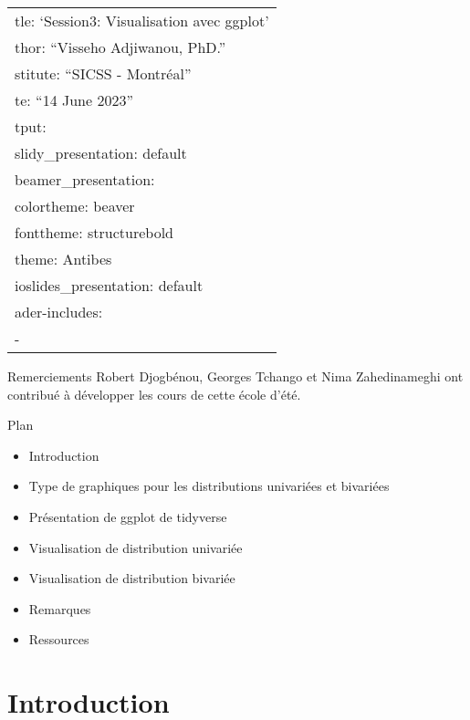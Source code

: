\documentclass[
  ignorenonframetext,
]{beamer}
\author{}
\date{\vspace{-2.5em}}
\providecommand{\tightlist}{%
  \setlength{\itemsep}{0pt}\setlength{\parskip}{0pt}}
\begin{document}
\begin{frame}
\begin{longtable}[]{@{}l@{}}
\toprule()
\endhead
tle: `Session3: Visualisation avec ggplot' \\
thor: ``Visseho Adjiwanou, PhD.'' \\
stitute: ``SICSS - Montréal'' \\
te: ``14 June 2023'' \\
tput: \\
slidy\_presentation: default \\
beamer\_presentation: \\
colortheme: beaver \\
fonttheme: structurebold \\
theme: Antibes \\
ioslides\_presentation: default \\
ader-includes: \\
- \\
\bottomrule()
\end{longtable}
\end{frame}

\begin{frame}{Remerciements}
\protect\hypertarget{remerciements}{}
Robert Djogbénou, Georges Tchango et Nima Zahedinameghi ont contribué à
développer les cours de cette école d'été.
\end{frame}

\begin{frame}{Plan}
\protect\hypertarget{plan}{}
\begin{itemize}
\tightlist
\item
  Introduction
\item
  Type de graphiques pour les distributions univariées et bivariées
\item
  Présentation de ggplot de tidyverse
\item
  Visualisation de distribution univariée
\item
  Visualisation de distribution bivariée
\item
  Remarques
\item
  Ressources
\end{itemize}
\end{frame}

\hypertarget{introduction}{%
\section{Introduction}\label{introduction}}
\end{document}

